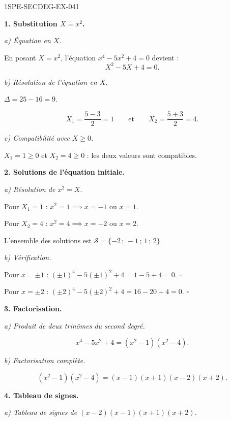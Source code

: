 \begin{corrige}{1SPE-SECDEG-EX-041}

\textbf{1. Substitution $X = x^2$.}

\textit{a) Équation en $X$.}


En posant $X = x^2$, l'équation $x^4 - 5x^2 + 4 = 0$ devient :
\[X^2 - 5X + 4 = 0.\]

\textit{b) Résolution de l'équation en $X$.}

$\Delta = 25 - 16 = 9$.

\[X_1 = \frac{5 - 3}{2} = 1 \qquad \text{et} \qquad X_2 = \frac{5 + 3}{2} = 4.\]

\textit{c) Compatibilité avec $X \geqslant 0$.}

$X_1 = 1 \geqslant 0$ et $X_2 = 4 \geqslant 0$ : les deux valeurs sont compatibles.

\medskip
\textbf{2. Solutions de l'équation initiale.}

\textit{a) Résolution de $x^2 = X$.}


Pour $X_1 = 1$ : $x^2 = 1 \implies x = -1$ ou $x = 1$.

Pour $X_2 = 4$ : $x^2 = 4 \implies x = -2$ ou $x = 2$.

L'ensemble des solutions est $\mathcal{S} = \{-2\,;\,-1\,;\,1\,;\,2\}$.

\textit{b) Vérification.}

Pour $x = \pm 1$ : $(\pm 1)^4 - 5(\pm 1)^2 + 4 = 1 - 5 + 4 = 0$. \hfill $\square$

Pour $x = \pm 2$ : $(\pm 2)^4 - 5(\pm 2)^2 + 4 = 16 - 20 + 4 = 0$. \hfill $\square$

\medskip
\textbf{3. Factorisation.}

\textit{a) Produit de deux trinômes du second degré.}


\[x^4 - 5x^2 + 4 = (x^2 - 1)(x^2 - 4).\]

\textit{b) Factorisation complète.}

\[(x^2 - 1)(x^2 - 4) = (x-1)(x+1)(x-2)(x+2).\]

\medskip
\textbf{4. Tableau de signes.}

\textit{a) Tableau de signes de $(x-2)(x-1)(x+1)(x+2)$.}



\end{corrige}
